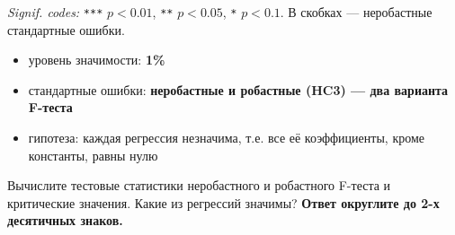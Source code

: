 \documentclass[
  russian,
]{article}
\providecommand{\tightlist}{%
  \setlength{\itemsep}{0pt}\setlength{\parskip}{0pt}}
\begin{document}
\emph{Signif. codes:} \texttt{***} \(p<0.01\), \texttt{**} \(p<0.05\),
\texttt{*} \(p<0.1\). В скобках --- неробастные стандартные ошибки.

\begin{tcolorbox}[enhanced jigsaw, arc=.35mm, bottomrule=.15mm, bottomtitle=1mm, breakable, colback=white, colbacktitle=quarto-callout-important-color!10!white, colframe=quarto-callout-important-color-frame, coltitle=black, left=2mm, leftrule=.75mm, opacityback=0, opacitybacktitle=0.6, rightrule=.15mm, title=\textcolor{quarto-callout-important-color}{\faExclamation}\hspace{0.5em}{Условия теста}, titlerule=0mm, toprule=.15mm, toptitle=1mm]

\begin{itemize}
\tightlist
\item
  уровень значимости: \textbf{1\%}
\item
  стандартные ошибки: \textbf{неробастные и робастные (HC3) --- два
  варианта F-теста}
\item
  гипотеза: каждая регрессия незначима, т.е. все её коэффициенты, кроме
  константы, равны нулю
\end{itemize}

\end{tcolorbox}

Вычислите тестовые статистики неробастного и робастного F-теста и
критические значения. Какие из регрессий значимы? \textbf{Ответ
округлите до 2-х десятичных знаков.}
\end{document}
